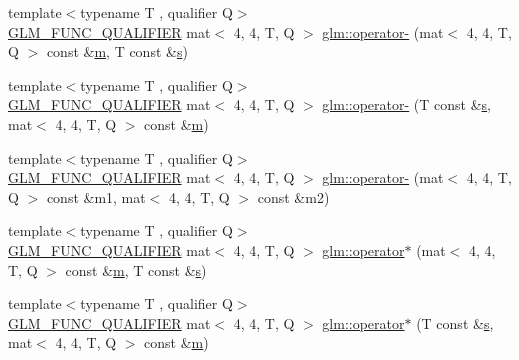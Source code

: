 \begin{DoxyCompactItemize}
\item 
{\footnotesize template$<$typename T , qualifier Q$>$ }\\\mbox{\hyperlink{setup_8hpp_a33fdea6f91c5f834105f7415e2a64407}{G\+L\+M\+\_\+\+F\+U\+N\+C\+\_\+\+Q\+U\+A\+L\+I\+F\+I\+ER}} mat$<$ 4, 4, T, Q $>$ \mbox{\hyperlink{namespaceglm_a56afe53e1478f62c6cff6b49e8cf8977}{glm\+::operator-\/}} (mat$<$ 4, 4, T, Q $>$ const \&\mbox{\hyperlink{_s_d_l__opengl__glext_8h_af593500c283bf1a787a6f947f503a5c2}{m}}, T const \&\mbox{\hyperlink{_s_d_l__opengl_8h_a4af680a6c683f88ed67b76f207f2e6e4}{s}})
\item 
{\footnotesize template$<$typename T , qualifier Q$>$ }\\\mbox{\hyperlink{setup_8hpp_a33fdea6f91c5f834105f7415e2a64407}{G\+L\+M\+\_\+\+F\+U\+N\+C\+\_\+\+Q\+U\+A\+L\+I\+F\+I\+ER}} mat$<$ 4, 4, T, Q $>$ \mbox{\hyperlink{namespaceglm_af1c9d3364d199255b36f08ead113e1ce}{glm\+::operator-\/}} (T const \&\mbox{\hyperlink{_s_d_l__opengl_8h_a4af680a6c683f88ed67b76f207f2e6e4}{s}}, mat$<$ 4, 4, T, Q $>$ const \&\mbox{\hyperlink{_s_d_l__opengl__glext_8h_af593500c283bf1a787a6f947f503a5c2}{m}})
\item 
{\footnotesize template$<$typename T , qualifier Q$>$ }\\\mbox{\hyperlink{setup_8hpp_a33fdea6f91c5f834105f7415e2a64407}{G\+L\+M\+\_\+\+F\+U\+N\+C\+\_\+\+Q\+U\+A\+L\+I\+F\+I\+ER}} mat$<$ 4, 4, T, Q $>$ \mbox{\hyperlink{namespaceglm_a003c4a084c06d618838ca9cbd23703d3}{glm\+::operator-\/}} (mat$<$ 4, 4, T, Q $>$ const \&m1, mat$<$ 4, 4, T, Q $>$ const \&m2)
\item 
{\footnotesize template$<$typename T , qualifier Q$>$ }\\\mbox{\hyperlink{setup_8hpp_a33fdea6f91c5f834105f7415e2a64407}{G\+L\+M\+\_\+\+F\+U\+N\+C\+\_\+\+Q\+U\+A\+L\+I\+F\+I\+ER}} mat$<$ 4, 4, T, Q $>$ \mbox{\hyperlink{namespaceglm_a5c0a2f1c927fa82395e818d38dda40af}{glm\+::operator$\ast$}} (mat$<$ 4, 4, T, Q $>$ const \&\mbox{\hyperlink{_s_d_l__opengl__glext_8h_af593500c283bf1a787a6f947f503a5c2}{m}}, T const \&\mbox{\hyperlink{_s_d_l__opengl_8h_a4af680a6c683f88ed67b76f207f2e6e4}{s}})
\item 
{\footnotesize template$<$typename T , qualifier Q$>$ }\\\mbox{\hyperlink{setup_8hpp_a33fdea6f91c5f834105f7415e2a64407}{G\+L\+M\+\_\+\+F\+U\+N\+C\+\_\+\+Q\+U\+A\+L\+I\+F\+I\+ER}} mat$<$ 4, 4, T, Q $>$ \mbox{\hyperlink{namespaceglm_a5e8439deb5e4bd729665a6f3babb10fe}{glm\+::operator$\ast$}} (T const \&\mbox{\hyperlink{_s_d_l__opengl_8h_a4af680a6c683f88ed67b76f207f2e6e4}{s}}, mat$<$ 4, 4, T, Q $>$ const \&\mbox{\hyperlink{_s_d_l__opengl__glext_8h_af593500c283bf1a787a6f947f503a5c2}{m}})

\end{DoxyCompactItemize}
